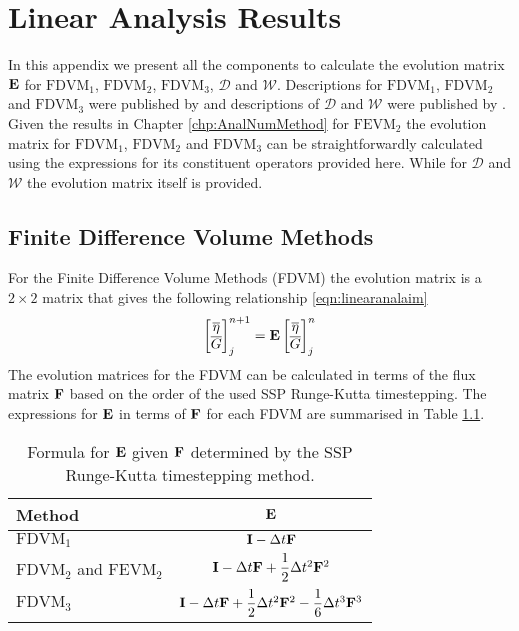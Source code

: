 \chapter{Linear Analysis Results}
\label{app:LinAnal}
In this appendix we present all the components to calculate the evolution matrix $\mathbf{E}$ for $\text{FDVM}_1$, $\text{FDVM}_2$, $\text{FDVM}_3$, $\mathcal{D}$ and $\mathcal{W}$. Descriptions for 
$\text{FDVM}_1$, $\text{FDVM}_2$ and $\text{FDVM}_3$ were published by \citet{Zoppou-etal-2017} and descriptions of $\mathcal{D}$ and $\mathcal{W}$ were published by \citet{Pitt-2018-61}. Given the results in Chapter \ref{chp:AnalNumMethod} for $\text{FEVM}_2$ the evolution matrix for $\text{FDVM}_1$, $\text{FDVM}_2$ and $\text{FDVM}_3$ can be straightforwardly calculated using the expressions for its constituent operators provided here. While for $\mathcal{D}$ and $\mathcal{W}$ the evolution matrix itself is provided.  

\section{Finite Difference Volume Methods}
For the Finite Difference Volume Methods (FDVM) the evolution matrix is a $2\times2$ matrix that gives the following relationship \eqref{eqn:linearanalaim}
\begin{equation}
\label{eqn:AppDEFDVM}
\begin{bmatrix}
\overline{\eta} \\\overline{G} 
\end{bmatrix}^{n+1}_j = \mathbf{E} \begin{bmatrix}
\overline{\eta} \\\overline{G}
\end{bmatrix}^{n}_j
\end{equation}
The evolution matrices for the FDVM can be calculated in terms of the flux matrix $\mathbf{F}$  based on the order of the used SSP Runge-Kutta timestepping. The expressions for $\mathbf{E}$ in terms of $\mathbf{F}$ for each FDVM are summarised in Table \ref{tab:RKstepfactor}.
\begin{table}
	\centering
	\begin{tabular}{l  c}
		Method & $\mathbf{E}$  \T\B \\
		\hline 
		$\text{FDVM}_1$& $\mathbf{I} - \Delta t\mathbf{F} $  \T\B \\
		$\text{FDVM}_2$ and $\text{FEVM}_2$ & $ \mathbf{I}  -\Delta t\mathbf{F} + \dfrac{1}{2}\Delta t^2\mathbf{F}^2$  \T\B \\
		$\text{FDVM}_3$& $\mathbf{I} -\Delta t\mathbf{F} + \dfrac{1}{2}\Delta t^2 \mathbf{F}^2 - \dfrac{1}{6}\Delta t^3 \mathbf{F}^3 $  \T\B \\
		\hline
	\end{tabular}
	\caption{Formula for $\mathbf{E}$ given $\mathbf{F}$ determined by the SSP Runge-Kutta timestepping method.}
	\label{tab:RKstepfactor}
\end{table}

